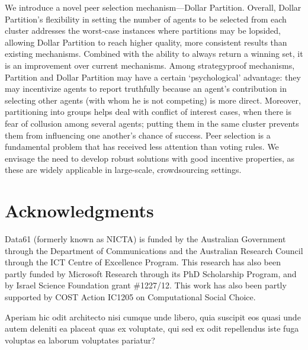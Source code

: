 \documentclass[letterpaper]{article}
\begin{document}
We introduce a novel peer selection mechanism---Dollar Partition.
Overall, Dollar Partition's flexibility in setting the number of agents to be selected from each cluster addresses the worst-case instances where partitions may be lopsided, allowing Dollar Partition to reach higher quality, more consistent results than existing mechanisms. Combined with the ability to always return a winning set, it is an improvement over current mechanisms.  Among strategyproof mechanisms, Partition and Dollar Partition may
have a certain `psychological' advantage: they may incentivize agents to report truthfully because an agent's contribution in selecting other agents (with whom he is not competing) is more direct.
Moreover, partitioning into groups helps deal with conflict of interest cases, when there is fear of collusion among several agents; putting them in the same cluster prevents them from influencing one another's chance of success.
Peer selection is a fundamental problem that has received less attention than voting rules.  We envisage the need to develop robust solutions with good incentive properties, as these are widely applicable in large-scale, crowdsourcing settings.

\vspace{-0.86mm}
\vspace{-1.48mm}
\section*{Acknowledgments}
Data61 (formerly known as NICTA) is funded by the Australian Government through the Department of Communications and the Australian Research Council through the ICT Centre of Excellence Program. This research has also been partly funded by Microsoft Research through its PhD Scholarship Program, and by Israel Science Foundation grant \#1227/12. This work has also been partly supported by COST Action IC1205 on Computational Social Choice.

\normalsize
  Aperiam hic odit architecto nisi cumque unde libero, quia suscipit eos quasi unde autem deleniti ea placeat quas ex voluptate, qui sed ex odit repellendus iste fuga voluptas ea laborum voluptates pariatur?\clearpage

\end{document}
